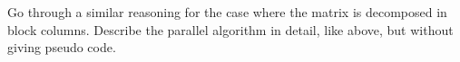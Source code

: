   Go through a similar reasoning for the case where the matrix is
  decomposed in block columns. Describe the parallel algorithm in
  detail, like above, but without giving pseudo code.
